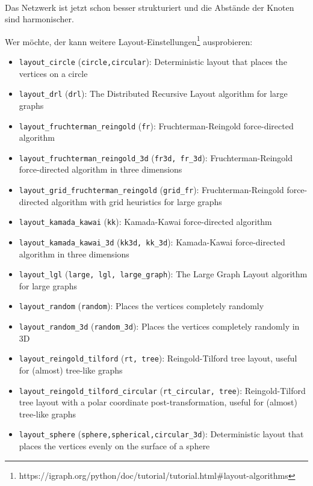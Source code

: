 \documentclass[11pt]{article}
\providecommand{\tightlist}{%
      \setlength{\itemsep}{0pt}\setlength{\parskip}{0pt}}
\begin{document}
    \begin{center}
    \end{center}
    { \hspace*{\fill} \\}
    
    Das Netzwerk ist jetzt schon besser strukturiert und die Abstände der
Knoten sind harmonischer.

Wer möchte, der kann weitere Layout-Einstellungen\footnote{https://igraph.org/python/doc/tutorial/tutorial.html\#layout-algorithms}
ausprobieren:

\begin{itemize}
\tightlist
\item
  \texttt{layout\_circle} (\texttt{circle,circular}): Deterministic
  layout that places the vertices on a circle
\item
  \texttt{layout\_drl} (\texttt{drl}): The Distributed Recursive Layout
  algorithm for large graphs
\item
  \texttt{layout\_fruchterman\_reingold} (\texttt{fr}):
  Fruchterman-Reingold force-directed algorithm
\item
  \texttt{layout\_fruchterman\_reingold\_3d} (\texttt{fr3d,\ fr\_3d}):
  Fruchterman-Reingold force-directed algorithm in three dimensions
\item
  \texttt{layout\_grid\_fruchterman\_reingold} (\texttt{grid\_fr}):
  Fruchterman-Reingold force-directed algorithm with grid heuristics for
  large graphs
\item
  \texttt{layout\_kamada\_kawai} (\texttt{kk}): Kamada-Kawai
  force-directed algorithm
\item
  \texttt{layout\_kamada\_kawai\_3d} (\texttt{kk3d,\ kk\_3d}):
  Kamada-Kawai force-directed algorithm in three dimensions
\item
  \texttt{layout\_lgl} (\texttt{large,\ lgl,\ large\_graph}): The Large
  Graph Layout algorithm for large graphs
\item
  \texttt{layout\_random} (\texttt{random}): Places the vertices
  completely randomly
\item
  \texttt{layout\_random\_3d} (\texttt{random\_3d}): Places the vertices
  completely randomly in 3D
\item
  \texttt{layout\_reingold\_tilford} (\texttt{rt,\ tree}):
  Reingold-Tilford tree layout, useful for (almost) tree-like graphs
\item
  \texttt{layout\_reingold\_tilford\_circular}
  (\texttt{rt\_circular,\ tree}): Reingold-Tilford tree layout with a
  polar coordinate post-transformation, useful for (almost) tree-like
  graphs
\item
  \texttt{layout\_sphere} (\texttt{sphere,spherical,circular\_3d}):
  Deterministic layout that places the vertices evenly on the surface of
  a sphere
\end{itemize}
\end{document}
